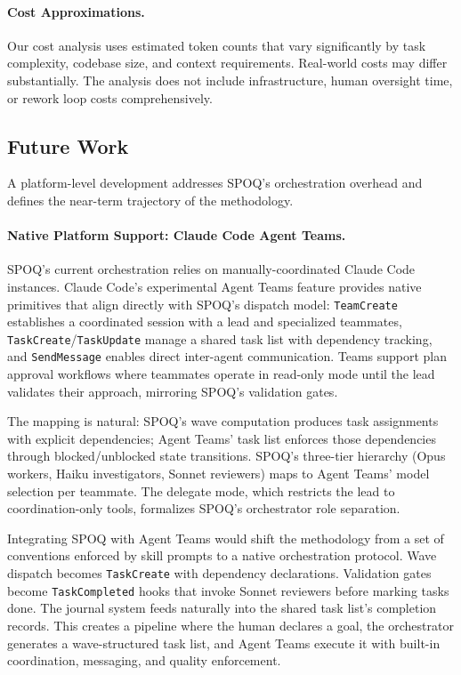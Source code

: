 \paragraph{Cost Approximations.}
Our cost analysis uses estimated token counts that vary
significantly by task complexity, codebase size, and context
requirements. Real-world costs may differ substantially. The
analysis does not include infrastructure, human oversight time,
or rework loop costs comprehensively.

\subsection{Future Work}
\label{subsec:future}

A platform-level development addresses SPOQ's orchestration overhead
and defines the near-term trajectory of the methodology.

\paragraph{Native Platform Support: Claude Code Agent Teams.}
SPOQ's current orchestration relies on manually-coordinated Claude Code
instances. Claude Code's experimental Agent Teams feature provides native
primitives that align directly with SPOQ's dispatch model: \texttt{TeamCreate}
establishes a coordinated session with a lead and specialized teammates,
\texttt{TaskCreate}/\texttt{TaskUpdate} manage a shared task list with
dependency tracking, and \texttt{SendMessage} enables direct inter-agent
communication. Teams support plan approval workflows where teammates
operate in read-only mode until the lead validates their approach, mirroring
SPOQ's validation gates.

The mapping is natural: SPOQ's wave computation produces task assignments
with explicit dependencies; Agent Teams' task list enforces those
dependencies through blocked/unblocked state transitions. SPOQ's three-tier
hierarchy (Opus workers, Haiku investigators, Sonnet reviewers) maps to
Agent Teams' model selection per teammate. The delegate mode, which
restricts the lead to coordination-only tools, formalizes SPOQ's
orchestrator role separation.

Integrating SPOQ with Agent Teams would shift the methodology from a
set of conventions enforced by skill prompts to a native orchestration
protocol. Wave dispatch becomes \texttt{TaskCreate} with dependency
declarations. Validation gates become \texttt{TaskCompleted} hooks that
invoke Sonnet reviewers before marking tasks done. The journal system
feeds naturally into the shared task list's completion records.
This creates a pipeline where the human declares a goal, the
orchestrator generates a wave-structured task list, and Agent Teams
execute it with built-in coordination, messaging, and quality enforcement.

